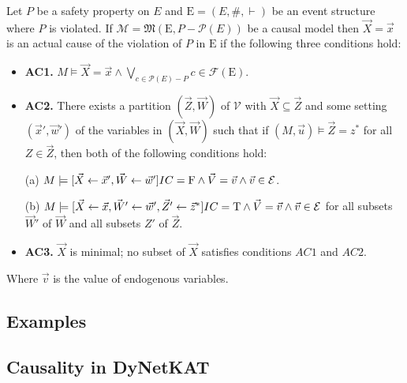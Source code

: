 \begin{definition}
    Let $P$ be a safety property on $E$ and $\mathrm{E} = (E,\#,\vdash)$ be an event structure where $P$ is violated.
    If $\mathcal{M} = \mathfrak{M}(\mathrm{E}, P - \mathcal{P}(E))$
    be a causal model then $\vec X = \vec x$ is
    an actual cause of the violation of $P$ in $\mathrm{E}$ if the
    following three conditions hold:
    \begin{itemize}
        \item  \textbf{AC1.} $M\models \vec X = \vec x
                  \wedge \bigvee_{c \in \mathcal{P}(E) - P}c \in \mathcal{F}(\mathrm{E})$.
        \item  \textbf{AC2. }There exists a partition $(\vec Z, \vec W)$ of $\mathcal{V}$ with $\vec X \subseteq \vec Z$ and some setting $(\vec x',\vec w')$ of the variables in $(\vec X,\vec W)$ such that if $(M,\vec u)\models \vec Z = z^*$ for all $Z\in \vec Z$, then both of the following conditions hold:

              (a) $M \models[\vec X \leftarrow \vec x', \vec W \leftarrow \vec w']
                  IC = \mathrm{F}
                  \wedge \vec V = \vec v
                  \wedge  \vec v \in \mathcal{E}$.

              (b) $M \models[\vec X\leftarrow \vec x, \vec W' \leftarrow \vec w', \vec Z'\leftarrow \vec z^*]
                  IC = \mathrm{T}
                  \wedge \vec V = \vec v
                  \wedge \vec v \in \mathcal{E}$
              for all subsets $\vec W'$ of $\vec W$ and all subsets $Z'$ of $\vec Z$.

        \item  \textbf{AC3.} $\vec X$ is minimal; no subset of $\vec X$ satisfies conditions $AC1$ and $AC2$.
    \end{itemize}
    Where $\vec v$ is the value of endogenous variables.
\end{definition}
\pagebreak


\subsection{Examples}


\subsection{Causality in DyNetKAT}
